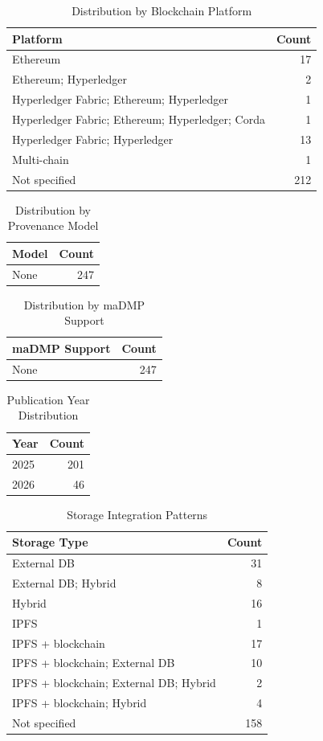 \documentclass{article}
\begin{document}
\begin{table}[htbp]
\centering
\caption{Distribution by Blockchain Platform}
\begin{tabular}{lr}
\toprule
Platform & Count \\
\midrule
Ethereum & 17 \\
Ethereum; Hyperledger & 2 \\
Hyperledger Fabric; Ethereum; Hyperledger & 1 \\
Hyperledger Fabric; Ethereum; Hyperledger; Corda & 1 \\
Hyperledger Fabric; Hyperledger & 13 \\
Multi-chain & 1 \\
Not specified & 212 \\
\bottomrule
\end{tabular}
\end{table}

\begin{table}[htbp]
\centering
\caption{Distribution by Provenance Model}
\begin{tabular}{lr}
\toprule
Model & Count \\
\midrule
None & 247 \\
\bottomrule
\end{tabular}
\end{table}

\begin{table}[htbp]
\centering
\caption{Distribution by maDMP Support}
\begin{tabular}{lr}
\toprule
maDMP Support & Count \\
\midrule
None & 247 \\
\bottomrule
\end{tabular}
\end{table}

\begin{table}[htbp]
\centering
\caption{Publication Year Distribution}
\begin{tabular}{lr}
\toprule
Year & Count \\
\midrule
2025 & 201 \\
2026 & 46 \\
\bottomrule
\end{tabular}
\end{table}

\begin{table}[htbp]
\centering
\caption{Storage Integration Patterns}
\begin{tabular}{lr}
\toprule
Storage Type & Count \\
\midrule
External DB & 31 \\
External DB; Hybrid & 8 \\
Hybrid & 16 \\
IPFS & 1 \\
IPFS + blockchain & 17 \\
IPFS + blockchain; External DB & 10 \\
IPFS + blockchain; External DB; Hybrid & 2 \\
IPFS + blockchain; Hybrid & 4 \\
Not specified & 158 \\
\bottomrule
\end{tabular}
\end{table}
\end{document}
